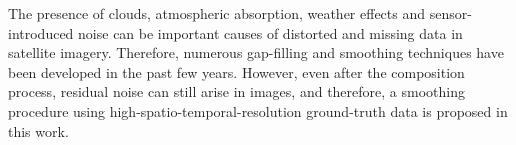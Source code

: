 
The presence of clouds, atmospheric absorption, weather effects and sensor-introduced noise can be important causes of distorted and missing data in satellite imagery. Therefore, numerous gap-filling and smoothing techniques have been developed in the past few years. However, even after the composition process, residual noise can still arise
in images, and therefore, a smoothing procedure using high-spatio-temporal-resolution ground-truth data is proposed in this work.


